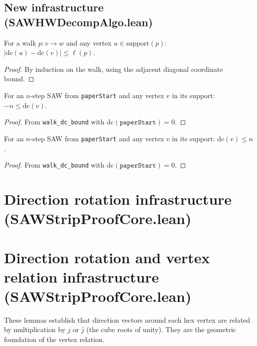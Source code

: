 \begin{lemma}
\subsection*{New infrastructure (SAWHWDecompAlgo.lean)}

\begin{lemma}\label{lem:walk_dc_bound}
\leanok
{}
  For a walk $p : v \to w$ and any vertex $u \in \mathrm{support}(p)$:
  $|\mathrm{dc}(u) - \mathrm{dc}(v)| \leq \ell(p)$.
\end{lemma}
\begin{proof}\leanok
  By induction on the walk, using the adjacent diagonal coordinate bound.
\end{proof}

\begin{lemma}\label{lem:saw_dc_lower}
\leanok
{}
  For an $n$-step SAW from \texttt{paperStart} and any vertex $v$ in its support:
  $-n \leq \mathrm{dc}(v)$.
\end{lemma}
\begin{proof}\leanok
  From \texttt{walk\_dc\_bound} with $\mathrm{dc}(\texttt{paperStart}) = 0$.
\end{proof}

\begin{lemma}\label{lem:saw_dc_upper}
\leanok
{}
  For an $n$-step SAW from \texttt{paperStart} and any vertex $v$ in its support:
  $\mathrm{dc}(v) \leq n$.
\end{lemma}
\begin{proof}\leanok
  From \texttt{walk\_dc\_bound} with $\mathrm{dc}(\texttt{paperStart}) = 0$.
\end{proof}

\section{Direction rotation infrastructure (SAWStripProofCore.lean)}

\section{Direction rotation and vertex relation infrastructure (SAWStripProofCore.lean)}

These lemmas establish that direction vectors around each hex vertex
are related by multiplication by $j$ or $\bar{j}$ (the cube roots of
unity). They are the geometric foundation of the vertex relation.


\end{lemma}
